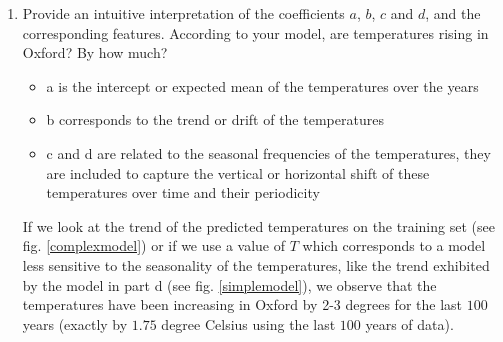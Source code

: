 \documentclass[12pt,twoside]{article}
\begin{document}
\begin{enumerate}
\begin{enumerate}
   \item Provide an intuitive interpretation of the coefficients $a$, $b$, $c$ and $d$, and the corresponding features. According to your model, are temperatures rising in Oxford? By how much?\\
   \begin{itemize}
   	\item a is the intercept or expected mean of the temperatures over the years
	\item b corresponds to the trend or drift of the temperatures
	\item c and d are related to the seasonal frequencies of the temperatures, they are included to capture the vertical or horizontal shift of these temperatures over time and their periodicity
   \end{itemize}
   If we look at the trend of the predicted temperatures on the training set (see fig. \ref{complexmodel}) 
   or if we use a value of $T$ which corresponds to a model less sensitive to the seasonality of the temperatures, like the trend
   exhibited by the model in part d (see fig. \ref{simplemodel}), we observe that the temperatures
   have been increasing in Oxford by 2-3 degrees for the last $100$ years (exactly by $1.75$ degree Celsius using the last $100$ years of data).
   
  \end{enumerate}
   
\newpage
   

\end{enumerate}
\end{document}
